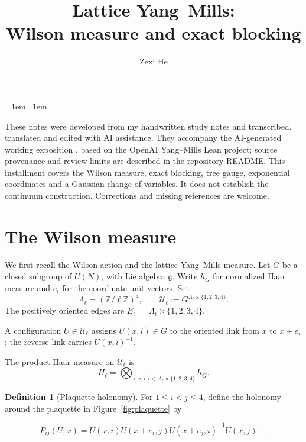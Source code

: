 \documentclass[10pt,reqno]{amsart}
\title[Lattice Yang--Mills: study notes]{Lattice Yang--Mills:\\Wilson measure and exact blocking}
\author{Zexi He}
\date{}
\theoremstyle{definition}
\newtheorem{definition}{Definition}[section]
\theoremstyle{remark}
\numberwithin{equation}{section}
\numberwithin{figure}{section}
\newcommand{\g}{\mathfrak g}
\newcommand{\Z}{\mathbb Z}
\begin{document}
\maketitle
\begin{list}{}{\leftmargin=1em\rightmargin=1em\topsep=4pt\parsep=0pt}
\item[]\small
These notes were developed from my handwritten study notes and transcribed,
translated and edited with AI assistance. They accompany the AI-generated
working exposition \cite{Exposition}, based on the OpenAI Yang--Mills Lean
project; source provenance and review limits are described in the repository
README. This installment covers the Wilson measure, exact blocking, tree gauge,
exponential coordinates and a Gaussian change of variables. It does not establish
the continuum construction. Corrections and missing references are welcome.
\end{list}

\tableofcontents
\medskip

\section{The Wilson measure}\label{sec:wilson}
We first recall the Wilson action and the lattice Yang--Mills measure.
Let $G$ be a closed subgroup of $U(N)$, with Lie algebra $\g$. Write $h_G$ for normalized Haar measure and $e_i$ for the coordinate unit vectors. Set
\begin{equation}\label{eq:display-001}
\Lambda_\ell=(\Z/\ell\Z)^4,
\qquad
\mathcal U_\ell:=G^{\Lambda_\ell\times\{1,2,3,4\}}.
\end{equation}
The positively oriented edges are $E_\ell^+=\Lambda_\ell\times\{1,2,3,4\}$.

A configuration $U\in\mathcal U_\ell$ assigns $U(x,i)\in G$ to the oriented link from $x$ to $x+e_i$;
the reverse link carries $U(x,i)^{-1}$.

The product Haar measure on $\mathcal U_\ell$ is
\begin{equation}\label{eq:display-002}
H_\ell=\bigotimes_{(x,i)\in\Lambda_\ell\times\{1,2,3,4\}}h_G.
\end{equation}

\begin{definition}[Plaquette holonomy] For $1\le i<j\le4$, define the holonomy around the plaquette in Figure~\ref{fig:plaquette} by



\begin{equation}\label{eq:plaquette-holonomy}
P_{ij}(U;x)
 =U(x,i)U(x+e_i,j)U(x+e_j,i)^{-1}U(x,j)^{-1}.
\end{equation}
\end{definition}
\end{document}
